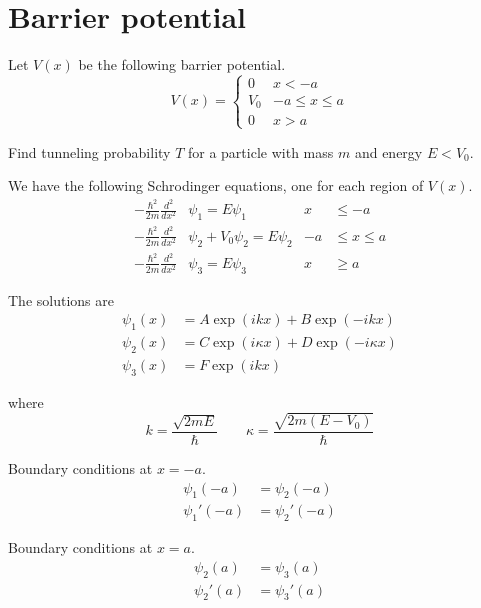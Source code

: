 


\section*{Barrier potential}

Let $V(x)$ be the following barrier potential.
\begin{equation*}
V(x)=\begin{cases}
0 & x<-a
\\
V_0 & -a\le x\le a
\\
0 & x>a
\end{cases}
\end{equation*}

Find tunneling probability $T$ for a particle with mass $m$ and energy $E<V_0$.

\bigskip
We have the following Schrodinger equations, one for each region of $V(x)$.
\begin{align*}
-\frac{\hbar^2}{2m}\frac{d^2}{dx^2}&\psi_1=E\psi_1 & x&\le-a
\\[1ex]
-\frac{\hbar^2}{2m}\frac{d^2}{dx^2}&\psi_2+V_0\psi_2=E\psi_2 & -a&\le x\le a
\\[1ex]
-\frac{\hbar^2}{2m}\frac{d^2}{dx^2}&\psi_3=E\psi_3 & x&\ge a
\end{align*}

The solutions are
\begin{align*}
\psi_1(x)&=A\exp(ikx)+B\exp(-ikx)
\\
\psi_2(x)&=C\exp(i\kappa x)+D\exp(-i\kappa x)
\\
\psi_3(x)&=F\exp(ikx)
\end{align*}

where
\begin{equation*}
k=\frac{\sqrt{2mE}}{\hbar}
\qquad
\kappa=\frac{\sqrt{2m(E-V_0)}}{\hbar}
\end{equation*}

Boundary conditions at $x=-a$.
\begin{align*}
\psi_1(-a)&=\psi_2(-a)
\\
\psi_1'(-a)&=\psi_2'(-a)
\end{align*}

Boundary conditions at $x=a$.
\begin{align*}
\psi_2(a)&=\psi_3(a)
\\
\psi_2'(a)&=\psi_3'(a)
\end{align*}

